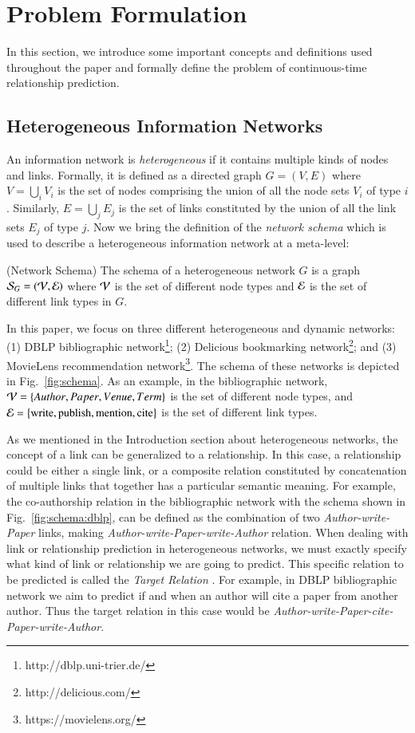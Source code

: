 \section{Problem Formulation}\label{sec:problem}
In this section, we introduce some important concepts and definitions used throughout the paper and formally define the problem of continuous-time relationship prediction.

\subsection{Heterogeneous Information Networks}

An information network is \emph{heterogeneous} if it contains multiple kinds of nodes and links. Formally, it is defined as a directed graph $G=(V,E)$ where $V = \bigcup_i V_i$ is the set of nodes comprising the union of all the node sets $V_i$ of type $i$. Similarly, $E=\bigcup_j E_j$ is the set of links constituted by the union of all the link sets $E_j$ of type $j$. Now we bring the definition of the \emph{network schema} \cite{sun2011pathsim} which is used to describe a heterogeneous information network at a meta-level:

\begin{definition}{(Network Schema)}
	The schema of a heterogeneous network $G$ is a graph $\mathcal{S}_G=(\mathcal{V}, \mathcal{E})$ where $\mathcal{V}$ is the set of different node types and $\mathcal{E}$ is the set of different link types in $G$.
\end{definition}

In this paper, we focus on three different heterogeneous and dynamic networks: (1) DBLP bibliographic network\footnote{http://dblp.uni-trier.de/}; (2) Delicious bookmarking network\footnote{http://delicious.com/}; and (3) MovieLens recommendation network\footnote{https://movielens.org/}. The schema of these networks is depicted in Fig.~\ref{fig:schema}. As an example, in the bibliographic network, $\mathcal{V}=\left\lbrace {Author}, {Paper}, {Venue}, {Term}\right\rbrace$ is the set of different node types, and $\mathcal{E}=\left\lbrace\text{write}, \text{publish}, \text{mention}, \text{cite}\right\rbrace$ is the set of different link types.

As we mentioned in the Introduction section about heterogeneous networks, the concept of a link can be generalized to a relationship. In this case, a relationship could be either a single link, or a composite relation constituted by concatenation of multiple links that together has a particular semantic meaning. For example, the co-authorship relation in the bibliographic network with the schema shown in Fig.~\ref{fig:schema:dblp}, can be defined as the combination of two \emph{Author-{write}-Paper} links, making \emph{Author-{write}-Paper-{write}-Author} relation. When dealing with link or relationship prediction in heterogeneous networks, we must exactly specify what kind of link or relationship we are going to predict. This specific relation to be predicted is called the \emph{Target Relation} \cite{sun2012will}. For example, in DBLP bibliographic network we aim to predict if and when an author will cite a paper from another author. Thus the target relation in this case would be \emph{Author-{write}-Paper-{cite}-Paper-{write}-Author}.

